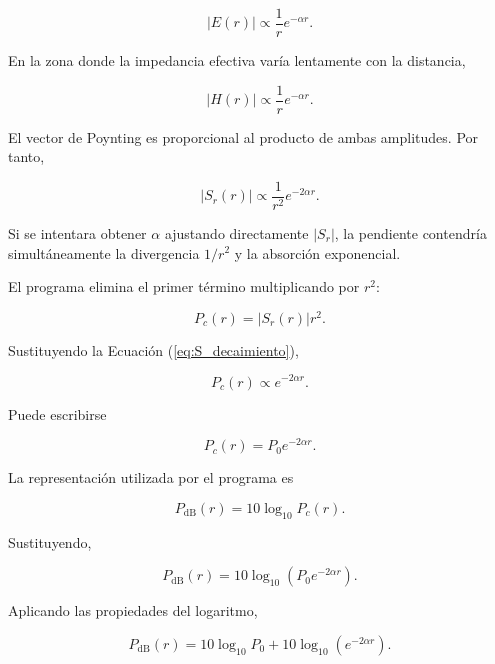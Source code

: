 \begin{equation}
|E(r)|
\propto
\frac{1}{r}
e^{-\alpha r}.
\label{eq:E_radial}
\end{equation}

En la zona donde la impedancia efectiva varía lentamente con la distancia,

\begin{equation}
|H(r)|
\propto
\frac{1}{r}
e^{-\alpha r}.
\end{equation}

El vector de Poynting es proporcional al producto de ambas amplitudes. Por tanto,

\begin{equation}
|S_r(r)|
\propto
\frac{1}{r^2}
e^{-2\alpha r}.
\label{eq:S_decaimiento}
\end{equation}

Si se intentara obtener $\alpha$ ajustando directamente $|S_r|$, la pendiente contendría simultáneamente la divergencia $1/r^2$ y la absorción exponencial.

El programa elimina el primer término multiplicando por $r^2$:

\begin{equation}
P_c(r)
=
|S_r(r)|r^2.
\label{eq:potencia_compensada}
\end{equation}

Sustituyendo la Ecuación (\ref{eq:S_decaimiento}),

\begin{equation}
P_c(r)
\propto
e^{-2\alpha r}.
\end{equation}

Puede escribirse

\begin{equation}
P_c(r)
=
P_0e^{-2\alpha r}.
\end{equation}

La representación utilizada por el programa es

\begin{equation}
P_{\mathrm{dB}}(r)
=
10\log_{10}P_c(r).
\end{equation}

Sustituyendo,

\begin{equation}
P_{\mathrm{dB}}(r)
=
10\log_{10}
\left(
P_0e^{-2\alpha r}
\right).
\end{equation}

Aplicando las propiedades del logaritmo,

\begin{equation}
P_{\mathrm{dB}}(r)
=
10\log_{10}P_0
+
10\log_{10}
\left(
e^{-2\alpha r}
\right).
\end{equation}

